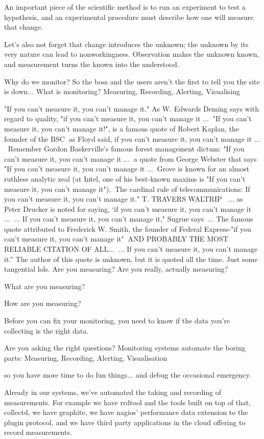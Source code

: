 \documentclass[online,helvetica]{chaksem}
\begin{document}
An important piece of the scientific method is to run an experiment to test a
hypothesis, and an experimental procedure must describe how one will measure
that change.

Let's also not forget that change introduces the unknown; the unknown by its
very nature can lead to nonworkingness.  Observation makes the unknown known,
and measurement turns the known into the understood.


Why do we monitor?
So the boss and the users aren't the first to tell you the site is down...
What is monitoring?
Measuring,
Recording,
Alerting,
Visualising

"If you can't measure it, you can't manage it."
As W. Edwards Deming says with regard to quality, "if you can't measure it, you can't manage it ..."If you can't measure it, you can't manage it!", is a famous quote of Robert Kaplan, the founder of the BSCas Floyd said, if you can’t measure it, you can’t manage it ... Remember Gordon Baskerville's famous forest management dictum: "If you can't measure it, you can't manage it ...a quote from George Webster that says "If you can't measure it, you can't manage it ...Grove is known for an almost ruthless analytic zeal (at Intel, one of his best-known maxims is "If you can't measure it, you can't manage it"),The cardinal rule of telecommunications: If you can't measure it, you can't manage it." T. TRAVERS WALTRIP ... as Peter Drucker is noted for saying, ‘if you can’t measure it, you can’t manage it ...... If you can't measure it, you can't manage it," Sugrue says... The famous quote attributed to Frederick W. Smith, the founder of Federal Express-"if you can't measure it, you can't manage it"AND PROBABLY THE MOST RELIABLE CITATION OF ALL...... If you can’t measure it, you can’t manage it.” The author of this quote is unknown, but it is quoted all the time.
Just some tangential lols.
Are you measuring?
Are you really, actually measuring?

What are you measuring?

How are you measuring?


Before you can fix your monitoring, you need to know if the data you're collecting is the right data.

Are you asking the right questions?
Monitoring systems
automate the boring parts:
Measuring,
Recording,
Alerting,Visualisation

so you have more time to do fun things... and debug the occasional emergency.

Already in our systems, we've automated the taking and recording of
measurements.  For example we have rrdtool and the tools built on top of that,
collectd, we have graphite, we have nagios' performance data extension to the
plugin protocol, and we have third party applications in the cloud offering to record
measurements.
\end{document}
